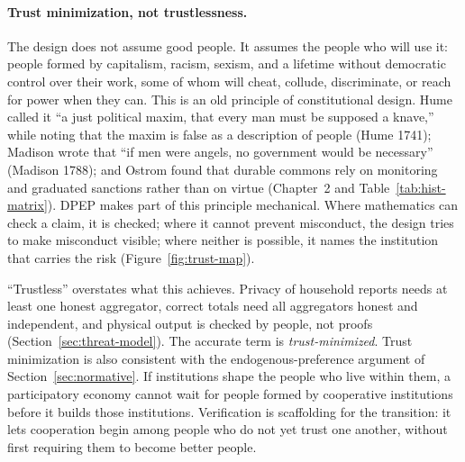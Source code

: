 \documentclass[10pt,twoside,openany]{book}
\theoremstyle{dpepstyle}
\begin{document}
\paragraph{Trust minimization, not trustlessness.} The design does not assume good people. It assumes the people who will use it: people formed by capitalism, racism, sexism, and a lifetime without democratic control over their work, some of whom will cheat, collude, discriminate, or reach for power when they can. This is an old principle of constitutional design. Hume called it ``a just political maxim, that every man must be supposed a knave,'' while noting that the maxim is false as a description of people (Hume 1741); Madison wrote that ``if men were angels, no government would be necessary'' (Madison 1788); and Ostrom found that durable commons rely on monitoring and graduated sanctions rather than on virtue (Chapter~2 and Table~\ref{tab:hist-matrix}). DPEP makes part of this principle mechanical. Where mathematics can check a claim, it is checked; where it cannot prevent misconduct, the design tries to make misconduct visible; where neither is possible, it names the institution that carries the risk (Figure~\ref{fig:trust-map}).

``Trustless'' overstates what this achieves. Privacy of household reports needs at least one honest aggregator, correct totals need all aggregators honest and independent, and physical output is checked by people, not proofs (Section~\ref{sec:threat-model}). The accurate term is \emph{trust-minimized}. Trust minimization is also consistent with the endogenous-preference argument of Section~\ref{sec:normative}. If institutions shape the people who live within them, a participatory economy cannot wait for people formed by cooperative institutions before it builds those institutions. Verification is scaffolding for the transition: it lets cooperation begin among people who do not yet trust one another, without first requiring them to become better people.
\end{document}
